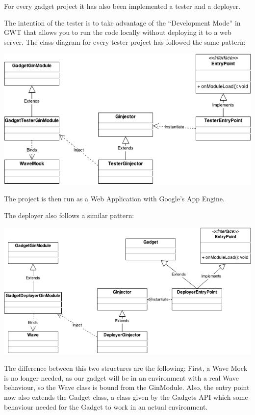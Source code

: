 For every gadget project it has also been implemented a tester and a deployer.

The intention of the tester is to take advantage of the ``Development Mode'' in GWT that allows you to run the code locally without deploying it to a web server. The class diagram for every tester project has followed the same pattern:

\begin{center}
\includegraphics[keepaspectratio, scale=0.6]{Media/Diagrams/Gadget/Tester.png}
\end{center}

The project is then run as a Web Application with Google's App Engine.

The deployer also follows a similar pattern:

\begin{center}
\includegraphics[keepaspectratio, scale=0.5]{Media/Diagrams/Gadget/Deployer.png}
\end{center}

The difference between this two structures are the following: First, a Wave Mock is no longer needed, as our gadget will be in an environment with a real Wave behaviour, so the Wave class is bound from the GinModule. Also, the entry point now also extends the Gadget class, a class given by the Gadgets API which some behaviour needed for the Gadget to work in an actual environment.







